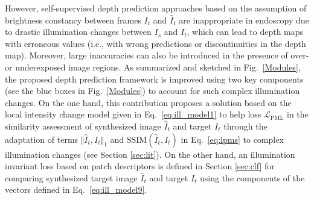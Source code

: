 \documentclass[a4paper,fleqn]{cas-dc}
\begin{document}
However, self-supervised depth prediction approaches based on the assumption of brightness constancy between frames $I_t$ and $\hat{I}_{t}$ are inappropriate in endoscopy due to drastic illumination changes between $I_s$ and $I_t$, which can lead to depth maps with erroneous values (i.e., with wrong predictions or discontinuities in the depth map). Moreover, large inaccuracies can also be introduced in the presence of over- or underexposed image regions. 
%
As summarized and sketched in Fig.~\ref{Modules}, the proposed depth prediction framework is improved using two key components (see the blue boxes in Fig.~\ref{Modules}) to account for such complex illumination changes.    
%
On the one hand, this contribution proposes a solution based on the local intensity change model given in Eq.~\eqref{eq:ill_model1} to help loss $\mathcal{L}_\textrm{PML}$ in the similarity assessment of synthesized image $\hat{I}_{t}$ and target $I_t$ through the adaptation of terms $\Vert\hat{I}_{t},I_t\Vert_1$ and $\textrm{SSIM}(\hat{I}_{t},I_t)$ in Eq.~\eqref{eq:lpms} to complex illumination changes (see Section \ref{sec:lit}). On the other hand, an illumination invariant loss based on patch descriptors is defined in Section  \ref{sec:clf} for comparing synthesized target image $\hat{I}_{t}$ and target $I_t$ using the components of the vectors defined in Eq.~\eqref{eq:ill_model9}.
%
%
\end{document}
